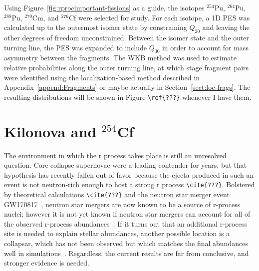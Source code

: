 Using Figure~\ref{fig:rprocimportant-fissions} as a guide, the isotopes $^{254}$Pu, $^{264}$Pu, $^{288}$Pu, $^{270}$Cm, and $^{276}$Cf were selected for study. For each isotope, a 1D PES was calculated up to the outermost isomer state by constraining $Q_{20}$ and leaving the other degrees of freedom unconstrained. Between the isomer state and the outer turning line, the PES was expanded to include $Q_{30}$ in order to account for mass asymmetry between the fragments. The WKB method was used to estimate relative probabilities along the outer turning line, at which stage fragment pairs were identified using the localization-based method described in Appendix~\ref{append:Fragments} or maybe actually in Section~\ref{sect:loc-frags}. The resulting distributions will be shown in Figure \verb|\ref{???}| whenever I have them.


\section{Kilonova and $^{254}$Cf}

The environment in which the r process takes place is still an unresolved question. Core-collapse supernovae were a leading contender for years, but that hypothesis has recently fallen out of favor because the ejecta produced in such an event is not neutron-rich enough to host a strong r process \verb|\cite{???}|. Bolstered by theoretical calculations \verb|\cite{???}| and the neutron star merger event GW170817~\cite{Abbott2017,Abbott2017a}, neutron star mergers are now known to be a source of r-process nuclei; however it is not yet known if neutron star mergers can account for all of the observed r-process abundances~\cite{Pian2017,Kasen2017}. If it turns out that an additional r-process site is needed to explain stellar abundances, another possible location is a collapsar, which has not been observed but which matches the final abundances well in simulations~\cite{Nakamura2013,Siegel2018}. Regardless, the current results are far from conclusive, and stronger evidence is needed.

